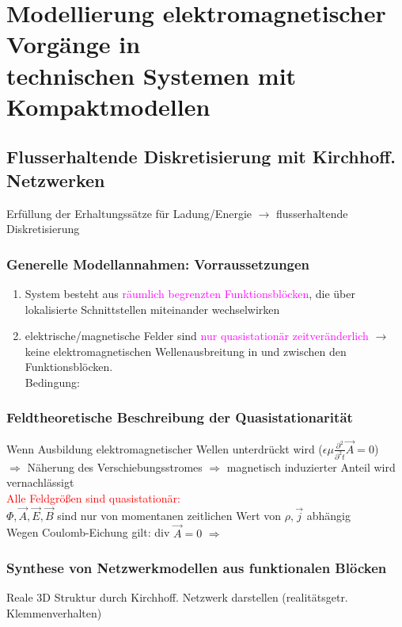 \documentclass[]{article}
\begin{document}
\newpage

\section{Modellierung elektromagnetischer Vorgänge in \\technischen Systemen mit Kompaktmodellen}
\subsection{Flusserhaltende Diskretisierung mit Kirchhoff. Netzwerken}
	Erfüllung der Erhaltungssätze für Ladung/Energie $\rightarrow$ flusserhaltende Diskretisierung
\subsubsection{Generelle Modellannahmen: Vorraussetzungen}
	
	\begin{enumerate}
		\item 
			System besteht aus \textcolor{magenta}{räumlich begrenzten Funktionsblöcken}, die über \\lokalisierte Schnittstellen miteinander wechselwirken
		\item	
			elektrische/magnetische Felder sind \textcolor{magenta}{nur quasistationär zeitveränderlich} $\rightarrow$ keine elektromagnetischen Wellenausbreitung in und zwischen den Funktionsblöcken. 
			\\Bedingung: 
	\end{enumerate}
\subsubsection{Feldtheoretische Beschreibung der Quasistationarität}
	Wenn Ausbildung elektromagnetischer Wellen unterdrückt wird ($\epsilon\mu\frac{∂^2}{∂^2t}\vec{A}=0$) 
	\\$\Rightarrow$ Näherung des Verschiebungsstromes $\Rightarrow$ magnetisch induzierter Anteil wird vernachlässigt
	\\\textcolor{red}{Alle Feldgrößen sind quasistationär:} 
	\\$\Phi,\vec{A},\vec{E},\vec{B}$ sind nur von momentanen zeitlichen Wert von $\rho,\vec{j}$ abhängig  
	\\Wegen Coulomb-Eichung gilt: div $\vec{A}=0$ $\Rightarrow$ 
\subsubsection{Synthese von Netzwerkmodellen aus funktionalen Blöcken}
	Reale 3D Struktur durch Kirchhoff. Netzwerk darstellen (realitätsgetr. Klemmenverhalten)
\end{document}
